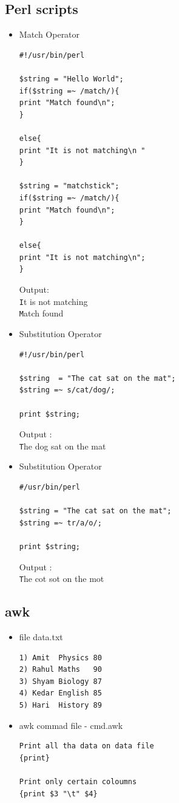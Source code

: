\documentclass{article}
\begin{document}
\subsection{Perl scripts}
\begin{itemize}
     \item Match Operator
\begin{verbatim}
#!/usr/bin/perl

$string = "Hello World";
if($string =~ /match/){
print "Match found\n";
}

else{
print "It is not matching\n "
}

$string = "matchstick";
if($string =~ /match/){
print "Match found\n";
}

else{
print "It is not matching\n";
}

\end{verbatim}

Output:\\

\texttt It is not matching \\
\texttt Match found

     \item Substitution Operator
\begin{verbatim}
#!/usr/bin/perl

$string  = "The cat sat on the mat";
$string =~ s/cat/dog/;

print $string;

\end{verbatim}



Output :\\

\texttt The dog sat on the mat

     \item Substitution Operator
\begin{verbatim}
#/usr/bin/perl

$string = "The cat sat on the mat";
$string =~ tr/a/o/;

print $string;

\end{verbatim}
Output :\\

\texttt The cot sot on the mot
\end{itemize}

\subsection{awk}
\begin{itemize}
\item file data.txt
\begin{verbatim}
1) Amit  Physics 80
2) Rahul Maths   90
3) Shyam Biology 87
4) Kedar English 85
5) Hari  History 89
\end{verbatim}
\item awk commad file - cmd.awk
\begin{verbatim}
Print all tha data on data file
{print}

Print only certain coloumns
{print $3 "\t" $4}
\end{verbatim}
\end{itemize}
\end{document}
